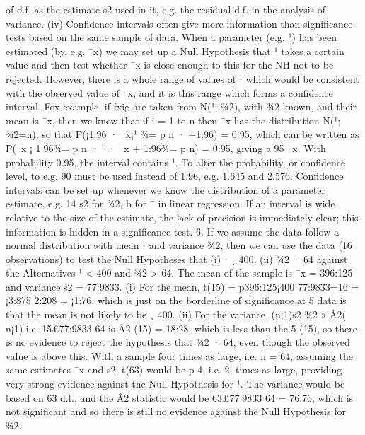 of d.f. as the estimate s2 used in it, e.g. the residual d.f. in the analysis of
variance.
(iv) Confidence intervals often give more information than significance tests
based on the same sample of data. When a parameter (e.g. ¹) has been
estimated (by, e.g. ¯x) we may set up a Null Hypothesis that ¹ takes a
certain value and then test whether ¯x is close enough to this for the NH not
to be rejected. However, there is a whole range of values of ¹ which would
be consistent with the observed value of ¯x, and it is this range which forms
a confidence interval. Fox example, if fxig are taken from N(¹; ¾2), with ¾2
known, and their mean is ¯x, then we know that if i = 1 to n then ¯x has the
distribution N(¹; ¾2=n), so that P(¡1:96 · ¯x¡¹
¾=
p
n
· +1:96) = 0:95, which
can be written as P(¯x ¡ 1:96¾=
p
n · ¹ · ¯x + 1:96¾=
p
n) = 0:95, giving a
95%
¯x. With probability 0.95, the interval contains ¹. To alter the probability,
or confidence level, to e.g. 90%
must be used instead of 1.96, e.g. 1.645 and 2.576. Confidence intervals can
be set up whenever we know the distribution of a parameter estimate, e.g.
14
s2 for ¾2, b for ¯ in linear regression. If an interval is wide relative to the size
of the estimate, the lack of precision is immediately clear; this information
is hidden in a significance test.
6. If we assume the data follow a normal distribution with mean ¹ and variance ¾2,
then we can use the data (16 observations) to test the Null Hypotheses that
(i) ¹ ¸ 400, (ii) ¾2 · 64 against the Alternatives ¹ < 400 and ¾2 > 64.
The mean of the sample is ¯x = 396:125 and variance s2 = 77:9833.
(i) For the mean, t(15) = p396:125¡400
77:9833=16
= ¡3:875
2:208 = ¡1:76, which is just on the
borderline of significance at 5%
data is that the mean is not likely to be ¸ 400.
(ii) For the variance, (n¡1)s2
¾2 » Â2(
n¡1) i.e. 15£77:9833
64 is Â2
(15) = 18:28, which is
less than the 5%
(15), so there is no evidence to reject the
hypothesis that ¾2 · 64, even though the observed value is above this.
With a sample four times as large, i.e. n = 64, assuming the same estimates
¯x and s2, t(63) would be
p
4, i.e. 2, times as large, providing very strong
evidence against the Null Hypothesis for ¹. The variance would be based
on 63 d.f., and the Â2 statistic would be 63£77:9833
64 = 76:76, which is not
significant and so there is still no evidence against the Null Hypothesis for
¾2.
